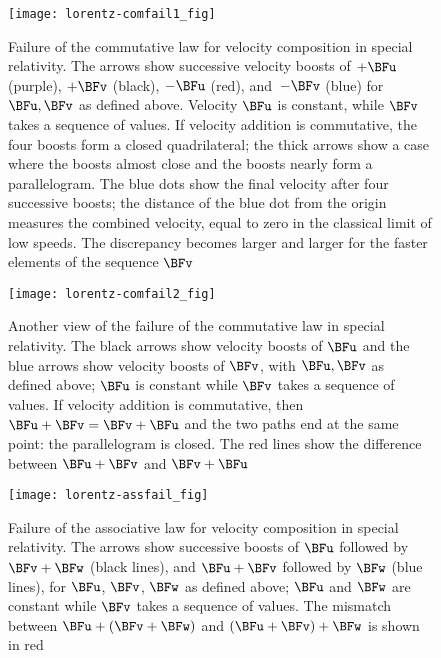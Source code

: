 \documentclass[ijoc,nonblindrev]{informs3} %
\begin{document}
\begin{figure}[htbp]
  \begin{center}
\texttt{[image: lorentz-comfail1\_fig]}
\caption{Failure\label{comfail1} of the commutative law for velocity
  composition in special relativity.  The arrows show successive
  velocity boosts of $+\BFu$ (purple), $+\BFv$ (black), $-\BFu$ (red),
  and~$-\BFv$ (blue) for $\BFu,\BFv$ as defined above.  Velocity $\BFu$ is
  constant, while $\BFv$ takes a sequence of values.  If velocity
  addition is commutative, the four boosts form a closed
  quadrilateral; the thick arrows show a case where the boosts almost
  close and the boosts nearly form a parallelogram.  The blue dots
  show the final velocity after four successive boosts; the distance
  of the blue dot from the origin measures the combined velocity,
  equal to zero in the classical limit of low speeds.  The discrepancy
  becomes larger and larger for the faster elements of the sequence
  $\BFv$}
  \end{center}
\end{figure}

\begin{figure}[htbp]
  \begin{center}
\texttt{[image: lorentz-comfail2\_fig]}
\caption{Another view of the failure of the commutative
  law\label{comfail2} in special relativity.  The black arrows show
  velocity boosts of $\BFu$ and the blue arrows show velocity boosts of
  $\BFv$, with $\BFu,\BFv$ as defined above; $\BFu$ is constant while
  $\BFv$ takes a sequence of values.  If velocity addition is
  commutative, then $\BFu+\BFv=\BFv+\BFu$ and the two paths end at the
  same point: the parallelogram is closed.  The red lines show the
  difference between $\BFu+\BFv$ and $\BFv+\BFu$}
  \end{center}
\end{figure}

\begin{figure}[htbp]
  \begin{center}
\texttt{[image: lorentz-assfail\_fig]}
\caption{Failure of the associative law \label{assfail} for velocity
  composition in special relativity.  The arrows show successive
  boosts of $\BFu$ followed by $\BFv+\BFw$ (black lines), and $\BFu+\BFv$
  followed by $\BFw$ (blue lines), for $\BFu$, $\BFv$, $\BFw$ as defined
  above; $\BFu$ and $\BFw$ are constant while $\BFv$ takes a sequence of
  values. The mismatch between $\BFu+\left(\BFv+\BFw\right)$ and
  $\left(\BFu+\BFv\right)+\BFw$ is shown in red}
  \end{center}
\end{figure}
\end{document}
